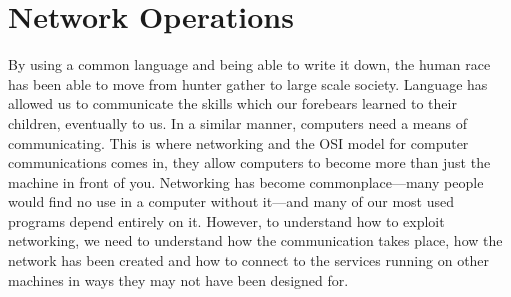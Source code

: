 \chapter{Network Operations}
	\label{ch:NetworkOperations}
	By using a common language and being able to write it down, the human race has been able to move from hunter gather to large scale society.
	Language has allowed us to communicate the skills which our forebears learned to their children, eventually to us.
	In a similar manner, computers need a means of communicating.
	This is where networking and the OSI model for computer communications comes in, they allow computers to become more than just the machine in front of you.
	Networking has become commonplace---many people would find no use in a computer without it---and many of our most used programs depend entirely on it.
	However, to understand how to exploit networking, we need to understand how the communication takes place, how the network has been created and how to connect to the services running on other machines in ways they may not have been designed for.
